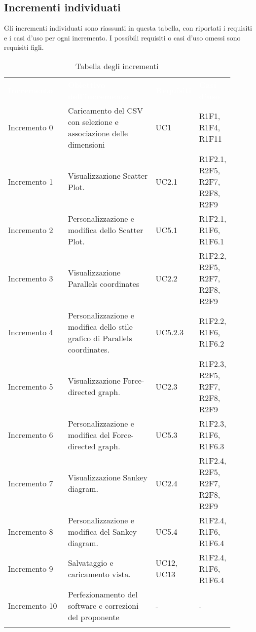 \subsection {Incrementi individuati}
Gli incrementi individuati sono riassunti in questa tabella, con riportati i requisiti e i casi d'uso per ogni incremento. I possibili requisiti o 
casi d'uso omessi sono requisiti figli. \newline
{\renewcommand{\arraystretch}{1.5}
\begin{longtable}{p{0.27\linewidth}p{0.40\linewidth}p{0.12\linewidth}p{0.12\linewidth}}
	\rowcolor[RGB]{33, 73, 50}
	\textcolor{white}{\textbf{Incremento}} & \textcolor{white}{\textbf{Obiettivo dell'incremento}} & \textcolor{white}{\textbf{Requisiti}} & \textcolor{white}{\textbf{Casi d'uso}}\\
    \rowcolor[RGB]{216, 235, 171}
    Incremento 0 & Caricamento del CSV con selezione e associazione delle dimensioni & UC1 & R1F1, R1F4, R1F11 \\
    
    \rowcolor[RGB]{233, 245, 206}
    Incremento 1 & Visualizzazione Scatter Plot. & UC2.1 & R1F2.1, R2F5, R2F7, R2F8, R2F9 \\
    
    \rowcolor[RGB]{216, 235, 171}
    Incremento 2 & Personalizzazione e modifica dello Scatter Plot. & UC5.1 & R1F2.1, R1F6, R1F6.1\\

    \rowcolor[RGB]{233, 245, 206}
    Incremento 3 & Visualizzazione Parallels coordinates & UC2.2 & R1F2.2, R2F5, R2F7, R2F8, R2F9\\

    \rowcolor[RGB]{216, 235, 171}
    Incremento 4 & Personalizzazione e modifica dello stile grafico di Parallels coordinates. & UC5.2.3 & R1F2.2, R1F6, R1F6.2\\
    
    \rowcolor[RGB]{233, 245, 206}
    Incremento 5 & Visualizzazione Force-directed graph. & UC2.3 & R1F2.3, R2F5, R2F7, R2F8, R2F9\\
    
    \rowcolor[RGB]{216, 235, 171}
    Incremento 6 & Personalizzazione e modifica del Force-directed graph. & UC5.3 & R1F2.3, R1F6, R1F6.3\\
    
    \rowcolor[RGB]{233, 245, 206}
    Incremento 7 & Visualizzazione Sankey diagram. & UC2.4 & R1F2.4, R2F5, R2F7, R2F8, R2F9\\

    \rowcolor[RGB]{216, 235, 171}
    Incremento 8 & Personalizzazione e modifica del Sankey diagram. & UC5.4 & R1F2.4, R1F6, R1F6.4\\

    \rowcolor[RGB]{216, 235, 171}
    Incremento 9 & Salvataggio e caricamento vista. & UC12, UC13 & R1F2.4, R1F6, R1F6.4\\

    \rowcolor[RGB]{233, 245, 206}
    Incremento 10 & Perfezionamento del software e correzioni del proponente  & - & - \\
    
    \caption{Tabella degli incrementi}
\end{longtable}	
}